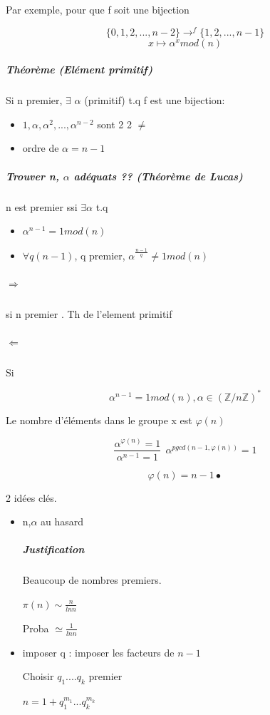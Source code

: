 \documentclass[12pt,a4paper]{article}
\begin{document}
Par exemple, pour que f soit une bijection 

\begin{displaymath}
\{0,1,2,...,n-2\} \longrightarrow^f \{1,2,...,n-1\}
\end{displaymath}
\begin{displaymath}
x \longmapsto \alpha^x mod(n)
\end{displaymath}

\subparagraph{Théorème (Elément primitif)}

Si n premier, $\exists$ $\alpha$ (primitif)
t.q f est une bijection:

\begin{itemize}
\item $1, \alpha, \alpha^ 2 , ... , \alpha ^{n-2}$ sont 2  2 $\neq$
\item ordre de $\alpha = n-1$
\end{itemize}

\subparagraph{Trouver n, $\alpha $ adéquats ?? (Théorème de Lucas)}

n est premier ssi $\exists \alpha $ t.q

\begin{itemize}
\item $\alpha^{n-1} = 1 mod(n)$
\item $\forall q (n-1)$, q premier, $\alpha^{\frac{n-1}{q}} \neq 1 mod(n)$
\end{itemize} 

\subparagraph{$\Rightarrow$}

si n premier . Th de l'element primitif

\subparagraph{$\Leftarrow$}

Si

\begin{displaymath}
\alpha ^{n-1}= 1mod(n), \alpha \in (\mathbb{Z}/n\mathbb{Z})^*
\end{displaymath}
 
Le nombre d'éléments dans le groupe x est $\varphi(n)$

\begin{displaymath}
\frac{\alpha^{\varphi(n)} = 1}{\alpha^{n-1} =1} \ \ \alpha^{pgcd(n-1,\varphi(n))} =1
\end{displaymath}

\begin{displaymath}
\varphi(n) = n-1   \bullet
\end{displaymath}

2 idées clés.
\begin{itemize}
\item n,$\alpha$ au hasard

\subparagraph{Justification}

Beaucoup de nombres premiers.

$\pi (n) \sim \frac{n}{ln n}$

Proba $ \simeq \frac{1}{ln n}$

\item imposer q : imposer les facteurs de $n-1$

Choisir $q_1 ....q_k$ premier

$n= 1 + q_1^{m_1} ... q_k^{m_k}$
\end{itemize}
\end{document}
